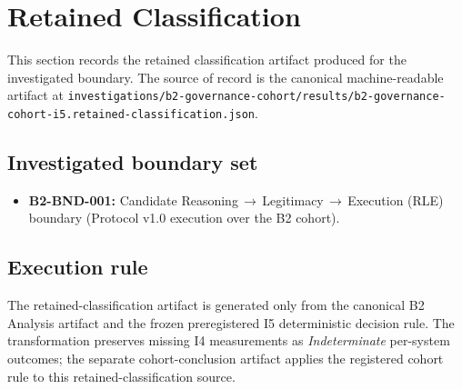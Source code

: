 \section{Retained Classification}
\label{sec:retained-classification}
This section records the retained classification artifact produced for the investigated boundary. The source of record is the canonical machine-readable artifact at \texttt{investigations/b2-governance-cohort/results/b2-governance-cohort-i5.retained-classification.json}.

\subsection{Investigated boundary set}
\begin{itemize}
  \item \textbf{B2-BND-001:} Candidate Reasoning\,$\rightarrow$\,Legitimacy\,$\rightarrow$\,Execution (RLE) boundary (Protocol v1.0 execution over the B2 cohort).
\end{itemize}

\subsection{Execution rule}
The retained-classification artifact is generated only from the canonical B2 Analysis artifact and the frozen preregistered I5 deterministic decision rule. The transformation preserves missing I4 measurements as \emph{Indeterminate} per-system outcomes; the separate cohort-conclusion artifact applies the registered cohort rule to this retained-classification source.

